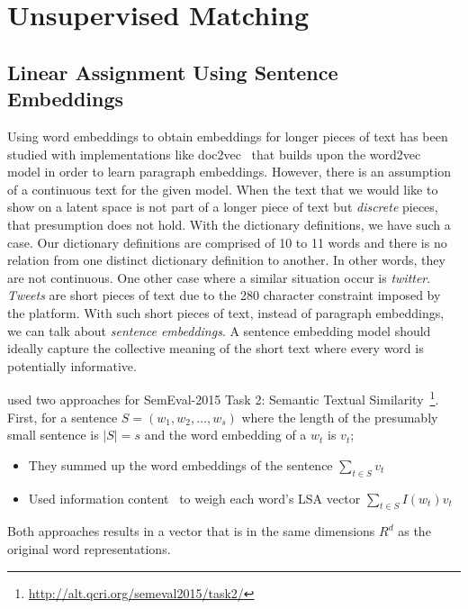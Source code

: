 \chapter{Unsupervised Matching}%
\label{chap:unsupervised_matching}


\section{Linear Assignment Using Sentence Embeddings}%
\label{sec:linear_assignment_using_sentence_embeddings}

Using word embeddings to obtain embeddings for longer pieces of text has been studied with implementations like doc2vec~\cite{le_distributed_2014} that builds upon the word2vec~\cite{mikolov_distributed_2013} model in order to learn paragraph embeddings.
However, there is an assumption of a continuous text for the given model.
When the text that we would like to show on a latent space is not part of a longer piece of text but \emph{discrete} pieces, that presumption does not hold.
With the dictionary definitions, we have such a case.
Our dictionary definitions are comprised of 10 to 11 words and there is no relation from one distinct dictionary definition to another.
In other words, they are not continuous.
One other case where a similar situation occur is \emph{twitter}.
\emph{Tweets} are short pieces of text due to the 280 character constraint imposed by the platform.
With such short pieces of text, instead of paragraph embeddings, we can talk about \emph{sentence embeddings}.
A sentence embedding model should ideally capture the collective meaning of the short text where every word is potentially informative.

\textcite{zhao_ecnu_2015} used two approaches for SemEval-2015 Task 2: Semantic Textual Similarity~\footnote{\url{http://alt.qcri.org/semeval2015/task2/}}.
First, for a sentence $S = (w_{1}, w_{2}, \dots, w_{s})$ where the length of the presumably small sentence is $|S| = s$ and the word embedding of a $w_t$ is $v_t$;
\begin{itemize}
    \item They summed up the word embeddings of the sentence $\sum_{t \in S}v_{t}$
    \item Used information content~\cite{saric_takelab_2012} to weigh each word's LSA vector $\sum_{t \in S} I(w_t) v_{t}$
\end{itemize}
Both approaches results in a vector that is in the same dimensions $R^{d}$ as the original word representations.

